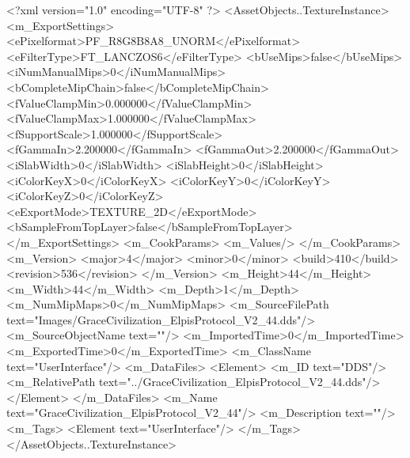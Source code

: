 <?xml version="1.0" encoding="UTF-8" ?>
<AssetObjects..TextureInstance>
	<m_ExportSettings>
		<ePixelformat>PF_R8G8B8A8_UNORM</ePixelformat>
		<eFilterType>FT_LANCZOS6</eFilterType>
		<bUseMips>false</bUseMips>
		<iNumManualMips>0</iNumManualMips>
		<bCompleteMipChain>false</bCompleteMipChain>
		<fValueClampMin>0.000000</fValueClampMin>
		<fValueClampMax>1.000000</fValueClampMax>
		<fSupportScale>1.000000</fSupportScale>
		<fGammaIn>2.200000</fGammaIn>
		<fGammaOut>2.200000</fGammaOut>
		<iSlabWidth>0</iSlabWidth>
		<iSlabHeight>0</iSlabHeight>
		<iColorKeyX>0</iColorKeyX>
		<iColorKeyY>0</iColorKeyY>
		<iColorKeyZ>0</iColorKeyZ>
		<eExportMode>TEXTURE_2D</eExportMode>
		<bSampleFromTopLayer>false</bSampleFromTopLayer>
	</m_ExportSettings>
	<m_CookParams>
		<m_Values/>
	</m_CookParams>
	<m_Version>
		<major>4</major>
		<minor>0</minor>
		<build>410</build>
		<revision>536</revision>
	</m_Version>
	<m_Height>44</m_Height>
	<m_Width>44</m_Width>
	<m_Depth>1</m_Depth>
	<m_NumMipMaps>0</m_NumMipMaps>
	<m_SourceFilePath text="Images/GraceCivilization_ElpisProtocol_V2_44.dds"/>
	<m_SourceObjectName text=""/>
	<m_ImportedTime>0</m_ImportedTime>
	<m_ExportedTime>0</m_ExportedTime>
	<m_ClassName text="UserInterface"/>
	<m_DataFiles>
		<Element>
			<m_ID text="DDS"/>
			<m_RelativePath text="../GraceCivilization_ElpisProtocol_V2_44.dds"/>
		</Element>
	</m_DataFiles>
	<m_Name text="GraceCivilization_ElpisProtocol_V2_44"/>
	<m_Description text=""/>
	<m_Tags>
		<Element text="UserInterface"/>
	</m_Tags>
</AssetObjects..TextureInstance>
